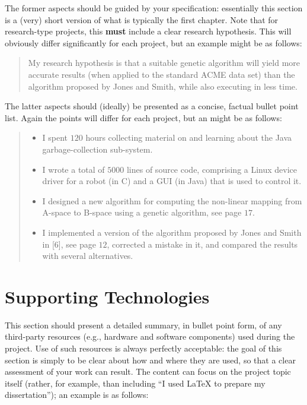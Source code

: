 \documentclass[ %
                    author={Lucas O'Dowd-Jones},
                supervisor={Dr. Alex Kavvos},
                    degree={MEng},
                     title={Variations on Normalisation by Evaluation in Haskell},
                  subtitle={},
                      type={programming languages},
                      year={2021}]{dissertation}
\begin{document}
The former aspects should be guided by your specification: essentially 
this section is a (very) short version of what is typically the first 
chapter.  Note that for research-type projects, this {\bf must} include 
a clear research hypothesis.  This will obviously differ significantly
for each project, but an example might be as follows:

\begin{quote}
My research hypothesis is that a suitable genetic algorithm will yield
more accurate results (when applied to the standard ACME data set) than 
the algorithm proposed by Jones and Smith, while also executing in less
time.
\end{quote}

\noindent
The latter aspects should (ideally) be presented as a concise, factual 
bullet point list.  Again the points will differ for each project, but 
an might be as follows:

\begin{quote}
\noindent
\begin{itemize}
\item I spent $120$ hours collecting material on and learning about the 
      Java garbage-collection sub-system. 
\item I wrote a total of $5000$ lines of source code, comprising a Linux 
      device driver for a robot (in C) and a GUI (in Java) that is 
      used to control it.
\item I designed a new algorithm for computing the non-linear mapping 
      from A-space to B-space using a genetic algorithm, see page $17$.
\item I implemented a version of the algorithm proposed by Jones and 
      Smith in [6], see page $12$, corrected a mistake in it, and 
      compared the results with several alternatives.
\end{itemize}
\end{quote}


\chapter*{Supporting Technologies}


\noindent
This section should present a detailed summary, in bullet point form, 
of any third-party resources (e.g., hardware and software components) 
used during the project.  Use of such resources is always perfectly 
acceptable: the goal of this section is simply to be clear about how
and where they are used, so that a clear assessment of your work can
result.  The content can focus on the project topic itself (rather,
for example, than including ``I used \mbox{\LaTeX} to prepare my 
dissertation''); an example is as follows:
\end{document}
